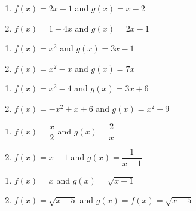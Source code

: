 \begin{multicols}{2}
\begin{enumerate}
\setcounter{enumi}{\value{HW}}

\item $f(x) = 2x+1$ and $g(x) = x-2$ \label{basicarithtwofirst}
\item $f(x) = 1-4x$ and $g(x) = 2x-1$

\setcounter{HW}{\value{enumi}}
\end{enumerate}
\end{multicols}

\begin{multicols}{2}
\begin{enumerate}
\setcounter{enumi}{\value{HW}}

\item $f(x) = x^2$ and $g(x) = 3x-1$
\item $f(x) = x^2-x$ and $g(x) = 7x$

\setcounter{HW}{\value{enumi}}
\end{enumerate}
\end{multicols}

\begin{multicols}{2}
\begin{enumerate}
\setcounter{enumi}{\value{HW}}

\item $f(x) = x^2-4$ and $g(x) = 3x+6$
\item $f(x) = -x^2+x+6$ and $g(x) = x^2-9$

\setcounter{HW}{\value{enumi}}
\end{enumerate}
\end{multicols}

\begin{multicols}{2}
\begin{enumerate}
\setcounter{enumi}{\value{HW}}

\item $f(x) = \dfrac{x}{2}$ and $g(x) = \dfrac{2}{x}$
\item $f(x) =x-1$ and $g(x) = \dfrac{1}{x-1}$

\setcounter{HW}{\value{enumi}}
\end{enumerate}
\end{multicols}

\begin{multicols}{2}
\begin{enumerate}
\setcounter{enumi}{\value{HW}}

\item $f(x) = x$ and $g(x) = \sqrt{x+1}$
\item $f(x) =\sqrt{x-5}$ and $g(x) = f(x) = \sqrt{x-5}$ \label{basicarithtwolast}

\setcounter{HW}{\value{enumi}}
\end{enumerate}
\end{multicols}

